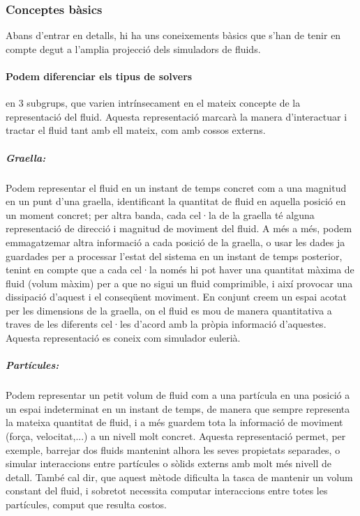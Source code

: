 \documentclass[a4paper]{article}
\begin{document}
	\subsubsection{Conceptes bàsics}
	Abans d'entrar en detalls, hi ha uns coneixements bàsics que s'han de tenir en compte degut a l'amplia projecció dels simuladors de fluids.
	\paragraph[Tipus de solvers]{Podem diferenciar els tipus de solvers} en 3 subgrups, que varien intrínsecament en el mateix concepte de la representació del fluid. Aquesta representació marcarà la manera d'interactuar i tractar el fluid tant amb ell mateix, com amb cossos externs.
	
	\subparagraph[Graella]{Graella:} Podem representar el fluid en un instant de temps concret com a una magnitud en un punt d'una graella, identificant la quantitat de fluid en aquella posició en un moment concret; per altra banda, cada cel·la de la graella té alguna representació de direcció i magnitud de moviment del fluid. \newline
	A més a més, podem emmagatzemar altra informació a cada posició de la graella, o usar les dades ja guardades per a processar l'estat del sistema en un instant de temps posterior, tenint en compte que a cada cel·la només hi pot haver una quantitat màxima de fluid (volum màxim) per a que no sigui un fluid comprimible, i així provocar una dissipació d'aquest i el conseqüent moviment.\newline
	En conjunt creem un espai acotat per les dimensions de la graella, on el fluid es mou de manera quantitativa a traves de les diferents cel·les d'acord amb la pròpia informació d'aquestes. \newline
	Aquesta representació es coneix com simulador eulerià.
	\subparagraph[Partícules]{Partícules:} Podem representar un petit volum de fluid com a una partícula en una posició a un espai indeterminat en un instant de temps, de manera que sempre representa la mateixa quantitat de fluid, i a més guardem tota la informació de moviment (força, velocitat,...) a un nivell molt concret. \newline
	Aquesta representació permet, per exemple, barrejar dos fluids mantenint alhora les seves propietats separades, o simular interaccions entre partícules o sòlids externs amb molt més nivell de detall.
	També cal dir, que aquest mètode dificulta la tasca de mantenir un volum constant del fluid, i sobretot necessita computar interaccions entre totes les partícules, comput que resulta costos. \newline
\end{document}
